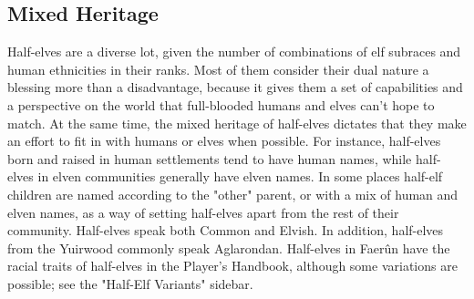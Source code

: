 \documentclass[10pt,a4paper,twoside,twocolumn,openany,bg=print,nodeprecatedcode]{dndbook}
\begin{document}
\subsection{Mixed Heritage}
Half-elves are a diverse lot, given the number of combinations of elf subraces and human ethnicities in their ranks. Most of them consider their dual nature a blessing more than a disadvantage, because it gives them a set of capabilities and a perspective on the world that full-blooded humans and elves can't hope to match.
At the same time, the mixed heritage of half-elves dictates that they make an effort to fit in with humans or elves when possible. For instance, half-elves born and raised in human settlements tend to have human names, while half-elves in elven communities generally have elven names. In some places half-elf children are named according to the "other" parent, or with a mix of human and elven names, as a way of setting half-elves apart from the rest of their community.
Half-elves speak both Common and Elvish. In addition, half-elves from the Yuirwood commonly speak Aglarondan.
Half-elves in Faerûn have the racial traits of half-elves in the Player's Handbook, although some variations are possible; see the "Half-Elf Variants" sidebar.
\end{document}
